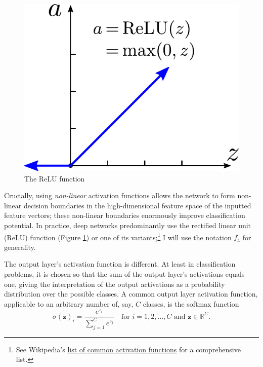 \documentclass[11pt, a4paper]{article}
\renewcommand{\vec}[1]{\bm{#1}}
\begin{document}
\begin{figure}
    \centering
    \includegraphics[width=\linewidth]{vector/relu.pdf}
    \caption{The ReLU function}
    \label{fig:relu}
\end{figure}
Crucially, using \textit{non-linear} activation functions allows the network to form non-linear decision boundaries in the high-dimensional feature space of the inputted feature vectors; these non-linear boundaries enormously improve classification potential.
In practice, deep networks predominantly use the rectified linear unit (ReLU) function (Figure \ref{fig:relu}) or one of its variants;\footnote{See Wikipedia's \href{https://en.wikipedia.org/wiki/Activation_function\#Comparison_of_activation_functions}{\underline{list of common activation functions}} for a comprehensive list.} I will use the notation $ f_{\text{a}} $ for generality.

The output layer's activation function is different.
At least in classification problems, it is chosen so that the sum of the output layer's activations equals one, giving the interpretation of the output activations as a probability distribution over the possible classes.
A common output layer activation function, applicable to an arbitrary number of, say, $ C $ classes, is the softmax function
\begin{equation}
    \sigma (\vec{z})_{i} = \frac{e^{z_{i}}}{\sum_{j = 1}^{C}e^{z_{j}}} \quad \text{for } i = 1, 2, \ldots, C \text{ and } \vec{z} \in \mathbb{R}^{C}. \label{eq:softmax}
\end{equation}
\end{document}
